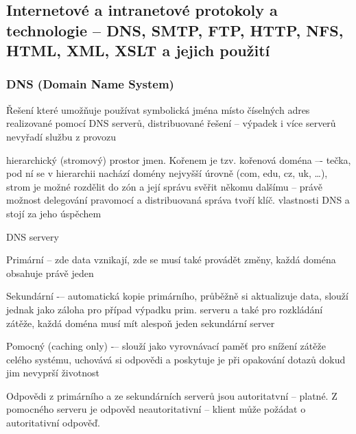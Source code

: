 \subsection{Internetové a intranetové protokoly a technologie -- DNS, SMTP, FTP, HTTP, NFS, HTML, XML, XSLT a jejich použití}

\subsubsection*{DNS (Domain Name System)}
\begin{pitemize}
	\item Řešení které umožňuje používat symbolická jména místo číselných adres realizované pomocí DNS serverů, distribuované řešení -- výpadek i více serverů nevyřadí službu z provozu
	\item hierarchický (stromový) prostor jmen. Kořenem je tzv. kořenová doména –- tečka, pod ní se v hierarchii nachází domény nejvyšší úrovně (com, edu, cz, uk, \dots), strom je možné rozdělit do zón a její správu svěřit někomu dalšímu -- právě možnost delegování pravomocí a distribuovaná správa tvoří klíč. vlastnosti DNS a stojí za jeho úspěchem
	\item DNS servery  
	\begin{pitemize}
		\item Primární -- zde data vznikají, zde se musí také provádět změny, každá doména obsahuje právě jeden
		\item Sekundární -– automatická kopie primárního, průběžně si aktualizuje data, slouží jednak jako záloha pro případ výpadku prim. serveru a také pro rozkládání zátěže, každá doména musí mít alespoň jeden sekundární server
		\item Pomocný (caching only) -– slouží jako vyrovnávací paměť pro snížení zátěže celého systému, uchovává si odpovědi a poskytuje je při opakování dotazů dokud jim nevyprší životnost
	\end{pitemize}
	\item Odpovědi z primárního a ze sekundárních serverů jsou autoritatvní – platné. Z pomocného serveru je odpověd neautoritativní -- klient může požádat o autoritativní odpověď.


\end{pitemize}

